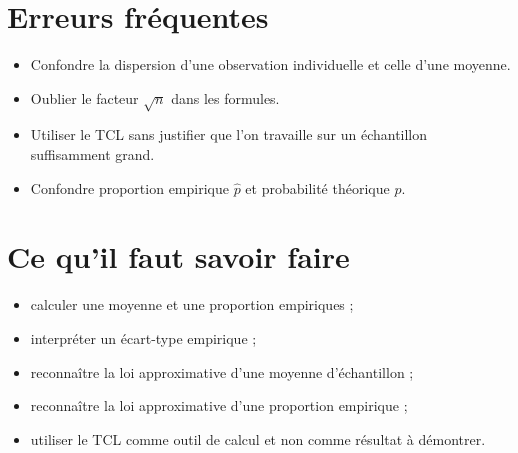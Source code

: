 \section{Erreurs fréquentes}

\begin{itemize}
    \item Confondre la dispersion d'une observation individuelle et celle d'une moyenne.
    \item Oublier le facteur $\sqrt{n}$ dans les formules.
    \item Utiliser le TCL sans justifier que l'on travaille sur un échantillon suffisamment grand.
    \item Confondre proportion empirique $\widehat{p}$ et probabilité théorique $p$.
\end{itemize}

\section{Ce qu'il faut savoir faire}

\begin{itemize}
    \item calculer une moyenne et une proportion empiriques ;
    \item interpréter un écart-type empirique ;
    \item reconnaître la loi approximative d'une moyenne d'échantillon ;
    \item reconnaître la loi approximative d'une proportion empirique ;
    \item utiliser le TCL comme outil de calcul et non comme résultat à démontrer.
\end{itemize}
